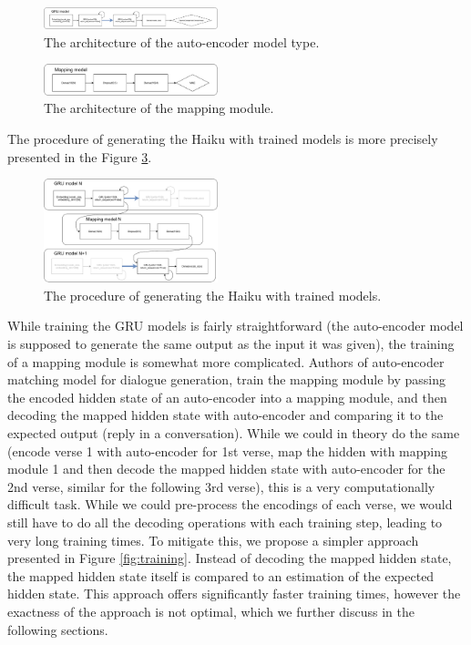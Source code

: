 \documentclass{acm_proc_article-sp}
\begin{document}
\begin{figure}[h!]
	\centering
	\includegraphics[width=0.45\textwidth]{flowchart/autoenc.pdf}
    \caption[The architecture of the auto-encoder model type.]{The architecture of the auto-encoder model type.}
    \label{fig:autoenc}
\end{figure}

\begin{figure}[h!]
	\centering
	\includegraphics[width=0.45\textwidth]{flowchart/mapping.pdf}
    \caption[The architecture of the mapping module.]{The architecture of the mapping module.}
    \label{fig:mapping}
\end{figure}

The procedure of generating the Haiku with trained models is more precisely presented in the Figure \ref{fig:generation}.

\begin{figure}[h!]
	\centering
	\includegraphics[width=0.45\textwidth]{flowchart/generation.pdf}
    \caption[The procedure of generating the Haiku with trained models.]{The procedure of generating the Haiku with trained models.}
    \label{fig:generation}
\end{figure}

While training the GRU models is fairly straightforward (the auto-encoder model is supposed to generate the same output as the input it was given), the training of a mapping module is somewhat more complicated. Authors \cite{luo2018autoencoder} of auto-encoder matching model for dialogue generation, train the mapping module by passing the encoded hidden state of an auto-encoder into a mapping module, and then decoding the mapped hidden state with auto-encoder and comparing it to the expected output (reply in a conversation). While we could in theory do the same (encode verse 1 with auto-encoder for 1st verse, map the hidden with mapping module 1 and then decode the mapped hidden state with auto-encoder for the 2nd verse, similar for the following 3rd verse), this is a very computationally difficult task. While we could pre-process the encodings of each verse, we would still have to do all the decoding operations with each training step, leading to very long training times. To mitigate this, we propose a simpler approach presented in Figure \ref{fig:training}. Instead of decoding the mapped hidden state, the mapped hidden state itself is compared to an estimation of the expected hidden state. This approach offers significantly faster training times, however the exactness of the approach is not optimal, which we further discuss in the following sections.
\end{document}
